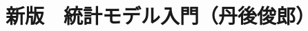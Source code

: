 \documentclass[a4paper]{ltjsreport}
\begin{document}
\chapter*{新版　統計モデル入門（丹後俊郎）}

\tableofcontents




\printbibliography
\end{document}
